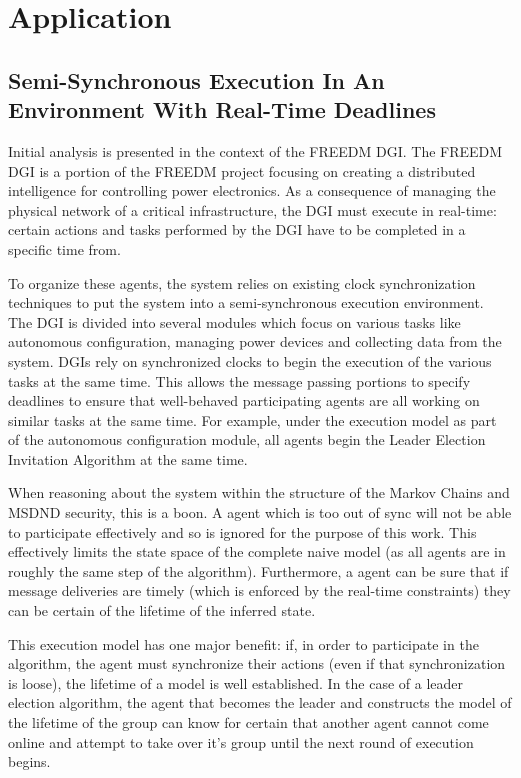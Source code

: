 \section{Application}

\subsection{Semi-Synchronous Execution In An Environment With Real-Time Deadlines}

Initial analysis is presented in the context of the FREEDM DGI. The FREEDM DGI is a portion of the FREEDM project focusing on creating a distributed intelligence for controlling power electronics. As a consequence of managing the physical network of a critical infrastructure, the DGI must execute in real-time: certain actions and tasks performed by the DGI have to be completed in a specific time from.

To organize these agents, the system relies on existing clock synchronization techniques to put the system into a semi-synchronous execution environment. The DGI is divided into several modules which focus on various tasks like autonomous configuration, managing power devices and collecting data from the system. DGIs rely on synchronized clocks to begin the execution of the various tasks at the same time. This allows the message passing portions to specify deadlines to ensure that well-behaved participating agents are all working on similar tasks at the same time. For example, under the execution model as part of the autonomous configuration module, all agents begin the Leader Election Invitation Algorithm at the same time.

When reasoning about the system within the structure of the Markov Chains and MSDND security, this is a boon. A agent which is too out of sync will not be able to participate effectively and so is ignored for the purpose of this work. This effectively limits the state space of the complete naive model (as all agents are in roughly the same step of the algorithm). Furthermore, a agent can be sure that if message deliveries are timely (which is enforced by the real-time constraints) they can be certain of the lifetime of the inferred state.

This execution model has one major benefit: if, in order to participate in the algorithm, the agent must synchronize their actions (even if that synchronization is loose), the lifetime of a model is well established. In the case of a leader election algorithm, the agent that becomes the leader and constructs the model of the lifetime of the group can know for certain that another agent cannot come online and attempt to take over it's group until the next round of execution begins.

